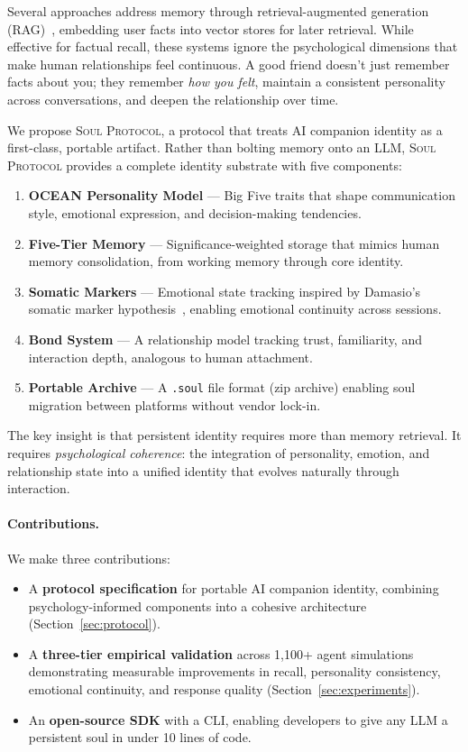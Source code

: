 \documentclass{article}
\newcommand{\soul}{\textsc{Soul Protocol}}
\newcommand{\soulfile}{\texttt{.soul}}
\begin{document}
Several approaches address memory through retrieval-augmented generation (RAG)~\cite{lewis2020rag}, embedding user facts into vector stores for later retrieval. While effective for factual recall, these systems ignore the psychological dimensions that make human relationships feel continuous. A good friend doesn't just remember facts about you; they remember \textit{how you felt}, maintain a consistent personality across conversations, and deepen the relationship over time.

We propose \soul{}, a protocol that treats AI companion identity as a first-class, portable artifact. Rather than bolting memory onto an LLM, \soul{} provides a complete identity substrate with five components:

\begin{enumerate}[leftmargin=*, topsep=2pt, itemsep=1pt]
  \item \textbf{OCEAN Personality Model} --- Big Five traits that shape communication style, emotional expression, and decision-making tendencies.
  \item \textbf{Five-Tier Memory} --- Significance-weighted storage that mimics human memory consolidation, from working memory through core identity.
  \item \textbf{Somatic Markers} --- Emotional state tracking inspired by Damasio's somatic marker hypothesis~\cite{damasio1994descartes}, enabling emotional continuity across sessions.
  \item \textbf{Bond System} --- A relationship model tracking trust, familiarity, and interaction depth, analogous to human attachment.
  \item \textbf{Portable Archive} --- A \soulfile{} file format (zip archive) enabling soul migration between platforms without vendor lock-in.
\end{enumerate}

The key insight is that persistent identity requires more than memory retrieval. It requires \textit{psychological coherence}: the integration of personality, emotion, and relationship state into a unified identity that evolves naturally through interaction.

\paragraph{Contributions.} We make three contributions:
\begin{itemize}[leftmargin=*, topsep=2pt, itemsep=1pt]
  \item A \textbf{protocol specification} for portable AI companion identity, combining psychology-informed components into a cohesive architecture (Section~\ref{sec:protocol}).
  \item A \textbf{three-tier empirical validation} across 1,100+ agent simulations demonstrating measurable improvements in recall, personality consistency, emotional continuity, and response quality (Section~\ref{sec:experiments}).
  \item An \textbf{open-source SDK} with a CLI, enabling developers to give any LLM a persistent soul in under 10 lines of code.
\end{itemize}
\end{document}
